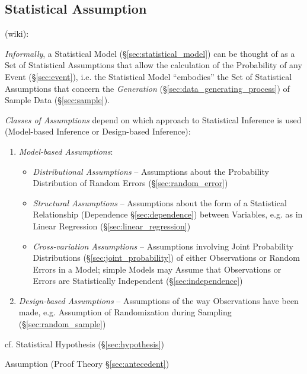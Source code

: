 \subsection{Statistical Assumption}\label{sec:statistical_assumption}

(wiki):

\emph{Informally}, a Statistical Model (\S\ref{sec:statistical_model}) can be
thought of as a Set of Statistical Assumptions that allow the calculation of the
Probability of any Event (\S\ref{sec:event}), i.e. the Statistical Model
``embodies'' the Set of Statistical Assumptions that concern the
\emph{Generation} (\S\ref{sec:data_generating_process}) of Sample Data
(\S\ref{sec:sample}).

\emph{Classes of Assumptions} depend on which approach to Statistical Inference
is used (Model-based Inference or Design-based Inference):
\begin{enumerate}
  \item \emph{Model-based Assumptions}:
    \begin{itemize}
      \item \emph{Distributional Assumptions} -- Assumptions about the
        Probability Distribution of Random Errors (\S\ref{sec:random_error})
      \item \emph{Structural Assumptions} -- Assumptions about the form of a
        Statistical Relationship (Dependence \S\ref{sec:dependence}) between
        Variables, e.g. as in Linear Regression (\S\ref{sec:linear_regression})
      \item \emph{Cross-variation Assumptions} -- Assumptions involving Joint
        Probability Distributions (\S\ref{sec:joint_probability}) of either
        Observations or Random Errors in a Model; simple Models may Assume that
        Observations or Errors are Statistically Independent
        (\S\ref{sec:independence})
    \end{itemize}
  \item \emph{Design-based Assumptions} -- Assumptions of the way Observations
    have been made, e.g. Assumption of Randomization during Sampling
    (\S\ref{sec:random_sample})
\end{enumerate}

cf. Statistical Hypothesis (\S\ref{sec:hypothesis})

\fist Assumption (Proof Theory \S\ref{sec:antecedent})



